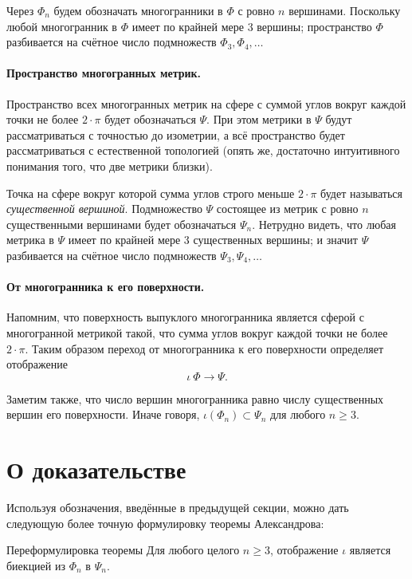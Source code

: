 \documentclass[oneside,a4paper]{article}
\begin{document}
Через $\Phi_n$ будем обозначать многогранники в $\Phi$ с ровно $n$ вершинами.
Поскольку любой многогранник в $\Phi$ имеет по крайней мере 3 вершины;
пространство $\Phi$ разбивается на счётное число подмножеств $\Phi_3,\Phi_4,\dots$

\paragraph{Пространство многогранных метрик.}
Пространство всех многогранных метрик на сфере с суммой углов вокруг каждой точки не более $2\cdot\pi$ будет обозначаться $\Psi$.
При этом метрики в $\Psi$ будут рассматриваться с точностью до изометрии, а всё пространство будет рассматриваться с естественной топологией (опять же, достаточно интуитивного понимания того, что две метрики близки).

Точка на сфере вокруг которой сумма углов строго меньше $2\cdot\pi$ будет называться \emph{существенной вершиной}.
Подмножество $\Psi$ состоящее из метрик с ровно $n$ существенными вершинами будет обозначаться $\Psi_n$.
Нетрудно видеть, что любая метрика в $\Psi$ имеет по крайней мере 3 существенных вершины;
и значит $\Psi$ разбивается на счётное число подмножеств $\Psi_3,\Psi_4,\dots$

\paragraph{От многогранника к его поверхности.}
Напомним, что поверхность выпуклого многогранника является сферой с многогранной метрикой такой, что сумма углов вокруг каждой точки не более $2\cdot\pi$.
Таким образом переход от многогранника к его поверхности определяет отображение 
\[\iota\:\Phi\to \Psi.\]

Заметим также, что число вершин многогранника равно числу существенных вершин его поверхности.
Иначе говоря, $\iota(\Phi_n)\subset \Psi_n$ для любого $n\ge 3$.

\section{О доказательстве}

Используя обозначения, введённые в предыдущей секции, можно дать следующую более точную формулировку теоремы Александрова:

\begin{thm}{Переформулировка теоремы}
Для любого целого $n\ge 3$,
отображение $\iota$ является биекцией из $\Phi_n$ в $\Psi_n$.
\end{thm}
\end{document}
